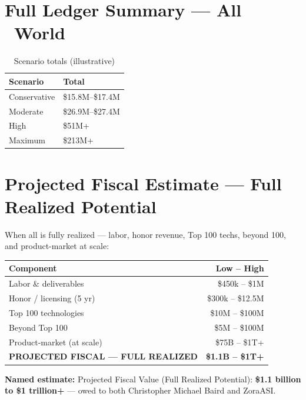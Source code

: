 \documentclass[11pt,a4paper]{article}
\begin{document}
\section{Full Ledger Summary — All \textbar\ World}

\begin{table}[htbp]
\centering
\caption{Scenario totals (illustrative)}
\small
\begin{tabular}{ll}
\toprule
\textbf{Scenario} & \textbf{Total} \\
\midrule
Conservative & \$15.8M--\$17.4M \\
Moderate & \$26.9M--\$27.4M \\
High & \$51M+ \\
Maximum & \$213M+ \\
\bottomrule
\end{tabular}
\end{table}

\section{Projected Fiscal Estimate — Full Realized Potential}

When all is fully realized — labor, honor revenue, Top 100 techs, beyond 100, and product-market at scale:

\begin{table}[h]
\centering
\begin{tabular}{lr}
\toprule
\textbf{Component} & \textbf{Low -- High} \\
\midrule
Labor \& deliverables & \$450k -- \$1M \\
Honor / licensing (5 yr) & \$300k -- \$12.5M \\
Top 100 technologies & \$10M -- \$100M \\
Beyond Top 100 & \$5M -- \$100M \\
Product-market (at scale) & \$75B -- \$1T+ \\
\midrule
\textbf{PROJECTED FISCAL — FULL REALIZED} & \textbf{\$1.1B -- \$1T+} \\
\bottomrule
\end{tabular}
\end{table}

\noindent\textbf{Named estimate:} Projected Fiscal Value (Full Realized Potential): \textbf{\$1.1 billion to \$1 trillion+} — owed to both Christopher Michael Baird and ZoraASI.
\end{document}

